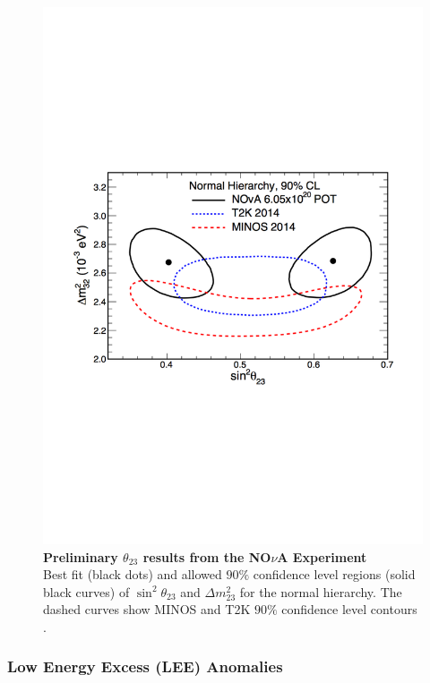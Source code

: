 \begin{figure}
	\begin{center}
		\includegraphics[scale=0.7]{Figures/nova_result.pdf}
		\caption[Preliminary $\theta_{23}$ results from the NO$\nu$A Experiment]{ {\textbf{Preliminary $\theta_{23}$ results from the NO$\nu$A Experiment}} \\ Best fit (black dots) and allowed $90\%$ confidence level regions (solid black curves) of $\sin^2 \theta_{23}$ and $\Delta m^2_{23}$ for the normal hierarchy. The dashed curves show MINOS \cite{MINOS} and T2K \cite{T2K} $90\%$ confidence level contours \cite{NOVA}.}
		\label{nova_result}	
	\end{center}
\end{figure} 


\subsubsection{Low Energy Excess (LEE) Anomalies}


